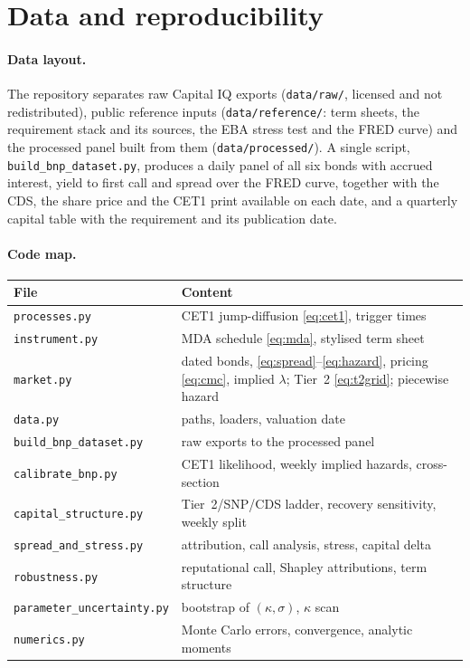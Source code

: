 \section{Data and reproducibility}\label{app:data}

\paragraph{Data layout.} The repository separates raw Capital IQ exports
(\texttt{data/raw/}, licensed and not redistributed), public reference inputs
(\texttt{data/reference/}: term sheets, the requirement stack and its sources, the EBA stress
test and the FRED curve) and the processed panel built from them (\texttt{data/processed/}).
A single script, \texttt{build\_bnp\_dataset.py}, produces a daily panel of all six bonds with
accrued interest, yield to first call and spread over the FRED curve, together with the CDS,
the share price and the CET1 print available on each date, and a quarterly capital table
with the requirement and its publication date.

\paragraph{Code map.}
\begin{center}
\small
\begin{tabular}{ll}
\toprule
File & Content \\
\midrule
\texttt{processes.py} & CET1 jump-diffusion \eqref{eq:cet1}, trigger times \\
\texttt{instrument.py} & MDA schedule \eqref{eq:mda}, stylised term sheet \\
\texttt{market.py} & dated bonds, \eqref{eq:spread}--\eqref{eq:hazard}, pricing \eqref{eq:cmc},
  implied $\lambda$; Tier~2 \eqref{eq:t2grid}; piecewise hazard \\
\texttt{data.py} & paths, loaders, valuation date \\
\texttt{build\_bnp\_dataset.py} & raw exports to the processed panel \\
\texttt{calibrate\_bnp.py} & CET1 likelihood, weekly implied hazards, cross-section \\
\texttt{capital\_structure.py} & Tier~2/SNP/CDS ladder, recovery sensitivity, weekly split \\
\texttt{spread\_and\_stress.py} & attribution, call analysis, stress, capital delta \\
\texttt{robustness.py} & reputational call, Shapley attributions, term structure \\
\texttt{parameter\_uncertainty.py} & bootstrap of $(\kappa,\sigma)$, $\kappa$ scan \\
\texttt{numerics.py} & Monte Carlo errors, convergence, analytic moments \\
\bottomrule
\end{tabular}
\end{center}

